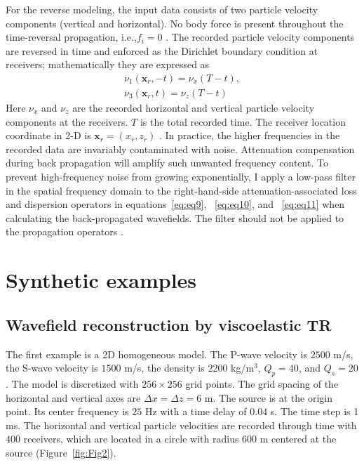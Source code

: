 For the reverse modeling, the input data consists of two particle velocity components (vertical and horizontal). No body force is present throughout the time-reversal propagation, i.e.,$f_i=0$ . The recorded particle velocity components are reversed in time and enforced as the Dirichlet boundary condition at receivers; mathematically they are expressed as
\begin{eqnarray}
\label{eq:eq12}  
 \nu_1(\mathbf{x}_r,-t)=\nu_x(T-t),\\
\nu_3(\mathbf{x}_r,t)=\nu_z(T-t)
\end{eqnarray}
Here $\nu_x$ and $\nu_z$ are the recorded horizontal and vertical particle velocity components at the receivers. $T$ is the total recorded time. The receiver location coordinate in 2-D is $\mathbf{x}_r=(x_r,z_r)$ .
In practice, the higher frequencies in the recorded data are invariably contaminated with noise. Attenuation compensation during back propagation will amplify such unwanted frequency content. To prevent high-frequency noise from growing exponentially, I apply a low-pass filter in the spatial frequency domain to the right-hand-side attenuation-associated loss and dispersion operators in equations~\ref{eq:eq9}, ~\ref{eq:eq10}, and ~\ref{eq:eq11} when calculating the back-propagated wavefields. The filter should not be applied to the propagation operators \cite[]{zhu15a}. 

\section{Synthetic examples}

\subsection{Wavefield reconstruction by viscoelastic TR}
The first example is a 2D homogeneous model. The P-wave velocity is $2500$ m/s, the S-wave velocity is $1500$ m/s, the density is $2200$ kg/m$^3$, $Q_p=40$, and $Q_s=20$. The model is discretized with $256\times 256$ grid points. The grid spacing of the horizontal and vertical axes are $\Delta x=\Delta z=6$ m. The source is at the origin point. Its center frequency is $25$ Hz with a time delay of $0.04$ s. The time step is 1 ms. The horizontal and vertical particle velocities are recorded through time with $400$ receivers, which are located in a circle with radius $600$ m centered at the source (Figure~\ref{fig:Fig2}).

